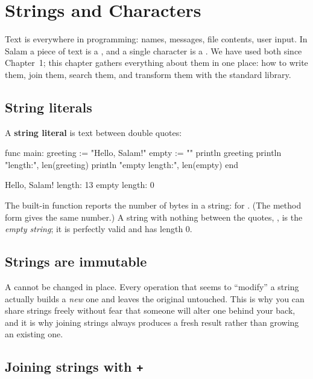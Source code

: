 \chapter{Strings and Characters}%
\label{ch:strings}

Text is everywhere in programming: names, messages, file contents, user input.
In Salam a piece of text is a , and a single character is a .
We have used both since Chapter~1; this chapter gathers everything about them in
one place: how to write them, join them, search them, and transform them with
the standard library.

\section{String literals}

A \textbf{string literal} is text between double quotes:

\begin{salamen}
func main:
    greeting := "Hello, Salam!"
    empty := ""
    println greeting
    println "length:", len(greeting)
    println "empty length:", len(empty)
end
\end{salamen}

\begin{progout}
Hello, Salam!
length: 13
empty length: 0
\end{progout}

The built-in  function reports the number of bytes in a string:
 for . (The method form 
gives the same number.) A string with nothing between the quotes,
, is the \emph{empty string}; it is perfectly valid and has length 0.

\section{Strings are immutable}

A  cannot be changed in place. Every operation that seems to ``modify''
a string actually builds a \emph{new} one and leaves the original untouched. This
is why you can share strings freely without fear that someone will alter one
behind your back, and it is why joining strings always produces a fresh result
rather than growing an existing one.

\section{Joining strings with \texttt{+}}

